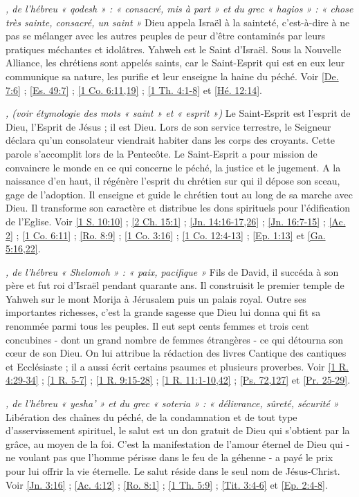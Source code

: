 \begin{multicols}{2}
\textit{, de l'hébreu « qodesh » : « consacré, mis à part » et du grec « hagios » : « chose très sainte, consacré, un saint »}\newline
Dieu appela Israël à la sainteté, c'est-à-dire à ne pas se mélanger avec les autres peuples de peur d'être contaminés par leurs pratiques méchantes et idolâtres. Yahweh est le Saint d'Israël. Sous la Nouvelle Alliance, les chrétiens sont appelés saints, car le Saint-Esprit qui est en eux leur communique sa nature, les purifie et leur enseigne la haine du péché. Voir \vref{De. 7:6} ; \vref{Es. 49:7} ; \vref{1 Co. 6:11,19} ; \vref{1 Th. 4:1-8} et \vref{Hé. 12:14}.

\textit{, (voir étymologie des mots « saint » et « esprit »)}\newline
Le Saint-Esprit est l'esprit de Dieu, l'Esprit de Jésus ; il est Dieu. Lors de son service terrestre, le Seigneur déclara qu'un consolateur viendrait habiter dans les corps des croyants. Cette parole s'accomplit lors de la Pentecôte. Le Saint-Esprit a pour mission de convaincre le monde en ce qui concerne le péché, la justice et le jugement. A la naissance d'en haut, il régénère l'esprit du chrétien sur qui il dépose son sceau, gage de l'adoption. Il enseigne et guide le chrétien tout au long de sa marche avec Dieu. Il transforme son caractère et distribue les dons spirituels pour l'édification de l'Eglise. Voir \vref{1 S. 10:10} ; \vref{2 Ch. 15:1} ; \vref{Jn. 14:16-17,26} ; \vref{Jn. 16:7-15} ; \vref{Ac. 2} ; \vref{1 Co. 6:11} ; \vref{Ro. 8:9} ; \vref{1 Co. 3:16} ; \vref{1 Co. 12:4-13} ; \vref{Ep. 1:13} et \vref{Ga. 5:16,22}.

\textit{, de l'hébreu « Shelomoh » : « paix, pacifique »}\newline
Fils de David, il succéda à son père et fut roi d'Israël pendant quarante ans. Il construisit le premier temple de Yahweh sur le mont Morija à Jérusalem puis un palais royal. Outre ses importantes richesses, c'est la grande sagesse que Dieu lui donna qui fit sa renommée parmi tous les peuples. Il eut sept cents femmes et trois cent concubines - dont un grand nombre de femmes étrangères - ce qui détourna son cœur de son Dieu. On lui attribue la rédaction des livres Cantique des cantiques et Ecclésiaste ; il a aussi écrit certains psaumes et plusieurs proverbes. Voir \vref{1 R. 4:29-34} ; \vref{1 R. 5-7} ; \vref{1 R. 9:15-28} ; \vref{1 R. 11:1-10,42} ; \vref{Ps. 72,127} et \vref{Pr. 25-29}.

\textit{, de l'hébreu « yesha' » et du grec « soteria » : « délivrance, sûreté, sécurité »}\newline
Libération des chaînes du péché, de la condamnation et de tout type d'asservissement spirituel, le salut est un don gratuit de Dieu qui s'obtient par la grâce, au moyen de la foi. C'est la manifestation de l'amour éternel de Dieu qui - ne voulant pas que l'homme périsse dans le feu de la géhenne - a payé le prix pour lui offrir la vie éternelle. Le salut réside dans le seul nom de Jésus-Christ. Voir \vref{Jn. 3:16} ; \vref{Ac. 4:12} ; \vref{Ro. 8:1} ; \vref{1 Th. 5:9} ; \vref{Tit. 3:4-6} et \vref{Ep. 2:4-8}.


\end{multicols}
